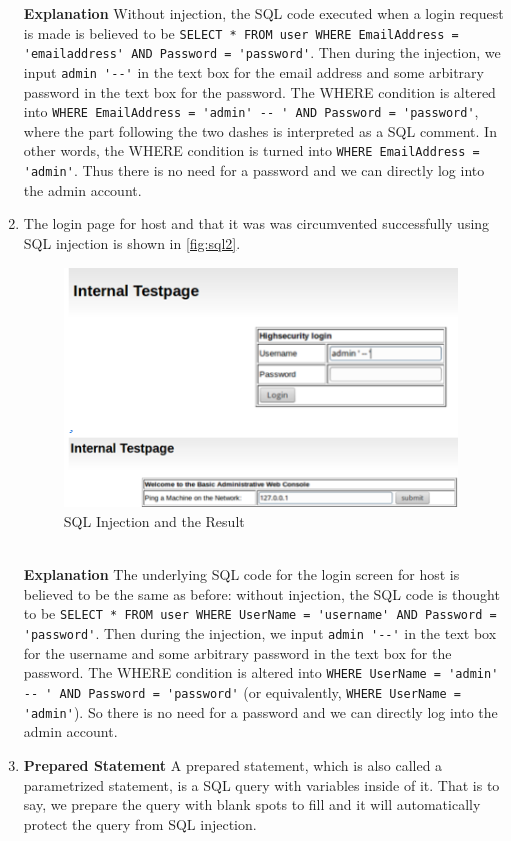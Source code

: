 \begin{enumerate}
  \textbf{Explanation} Without injection, the SQL code executed when a login request is made is believed to be \lstinline{SELECT * FROM user WHERE EmailAddress = 'emailaddress' AND Password = 'password'}. Then during the injection, we input \lstinline{admin '--'} in the text box for the email address and some arbitrary password in the text box for the password. The WHERE condition is altered into \lstinline{WHERE EmailAddress = 'admin' -- ' AND Password = 'password'}, where the part following the two dashes is interpreted as a SQL comment. In other words, the WHERE condition is turned into \lstinline{WHERE EmailAddress = 'admin'}. Thus there is no need for a password and we can directly log into the admin account.
\item The login page for host  and that it was was circumvented successfully using SQL injection is shown in \autoref{fig:sql2}.
\begin{figure}[h!]
	\caption{SQL Injection and the Result}
        \label{fig:sql2}
	\centering \includegraphics[height=2.5in]{sqli2}
\end{figure}
\\
  \textbf{Explanation} The underlying SQL code for the login screen for host  is believed to be the same as before: without injection, the SQL code is thought to be \lstinline{SELECT * FROM user WHERE UserName = 'username' AND Password = 'password'}. Then during the injection, we input \lstinline{admin '--'} in the text box for the username and some arbitrary password in the text box for the password. The WHERE condition is altered into \lstinline{WHERE UserName = 'admin' -- ' AND Password = 'password'} (or equivalently, \lstinline{WHERE UserName = 'admin'}). So there is no need for a password and we can directly log into the admin account.
\item \textbf{Prepared Statement} 
  A prepared statement, which is also called a parametrized statement, is a SQL query with variables inside of it. That is to say, we prepare the query with blank spots to fill and it will automatically protect the query from SQL injection.


\end{enumerate}

